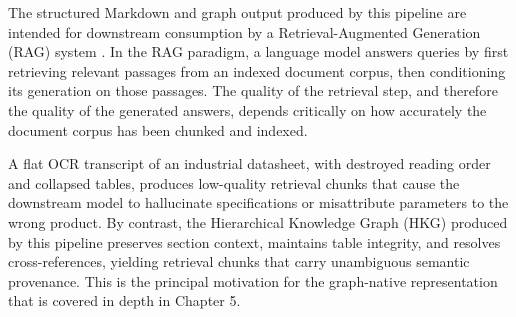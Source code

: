 The structured Markdown and graph output produced by this pipeline are intended for downstream consumption by a Retrieval-Augmented Generation (RAG) system \citep{rag_lewis}. In the RAG paradigm, a language model answers queries by first retrieving relevant passages from an indexed document corpus, then conditioning its generation on those passages. The quality of the retrieval step, and therefore the quality of the generated answers, depends critically on how accurately the document corpus has been chunked and indexed.

A flat OCR transcript of an industrial datasheet, with destroyed reading order and collapsed tables, produces low-quality retrieval chunks that cause the downstream model to hallucinate specifications or misattribute parameters to the wrong product. By contrast, the Hierarchical Knowledge Graph (HKG) produced by this pipeline preserves section context, maintains table integrity, and resolves cross-references, yielding retrieval chunks that carry unambiguous semantic provenance. This is the principal motivation for the graph-native representation that is covered in depth in Chapter 5.

